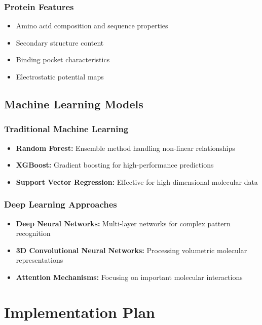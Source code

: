 \documentclass[12pt,a4paper]{article}
\begin{document}
\subsubsection{Protein Features}
\begin{itemize}
    \item Amino acid composition and sequence properties
    \item Secondary structure content
    \item Binding pocket characteristics
    \item Electrostatic potential maps
\end{itemize}

\subsection{Machine Learning Models}
\subsubsection{Traditional Machine Learning}
\begin{itemize}
    \item \textbf{Random Forest:} Ensemble method handling non-linear relationships
    \item \textbf{XGBoost:} Gradient boosting for high-performance predictions
    \item \textbf{Support Vector Regression:} Effective for high-dimensional molecular data
\end{itemize}

\subsubsection{Deep Learning Approaches}
\begin{itemize}
    \item \textbf{Deep Neural Networks:} Multi-layer networks for complex pattern recognition
    \item \textbf{3D Convolutional Neural Networks:} Processing volumetric molecular representations
    \item \textbf{Attention Mechanisms:} Focusing on important molecular interactions
\end{itemize}

\section{Implementation Plan}
\end{document}

